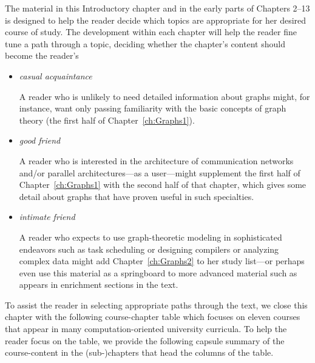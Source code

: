 The material in this Introductory chapter and in the early parts of Chapters 2--13 is designed to help the reader decide which topics are appropriate for her desired course of study.  The development within each chapter will help the reader fine tune a path through a topic, deciding whether the chapter's content should become the reader's
\begin{itemize}
\item
{\em casual acquaintance}

\smallskip

A reader who is unlikely to need detailed information about graphs might, for instance, want only passing familiarity with the basic concepts of graph theory (the first half of Chapter~\ref{ch:Graphs1}).

\medskip\item
{\em good friend}

\smallskip

A reader who is interested in the architecture of communication networks and/or parallel architectures---as a user---might supplement the first half of Chapter~\ref{ch:Graphs1} with the second half of that chapter, which gives some detail about graphs that have proven useful in such specialties.

\medskip\item
{\em intimate friend}

\smallskip

A reader who expects to use graph-theoretic modeling in sophisticated endeavors such as task scheduling or designing compilers or analyzing complex data might add Chapter~\ref{ch:Graphs2} to her study list---or perhaps even use this material as a springboard to more advanced material such as appears in enrichment sections in the text.
\end{itemize}

\bigskip

To assist the reader in selecting appropriate paths through the text, we close this chapter with the following course-chapter table which focuses on eleven courses that appear in many computation-oriented university curricula.  To help the reader focus on the table, we provide the following capsule summary of the course-content in the (sub-)chapters that head the columns of the table.

 \bigskip


